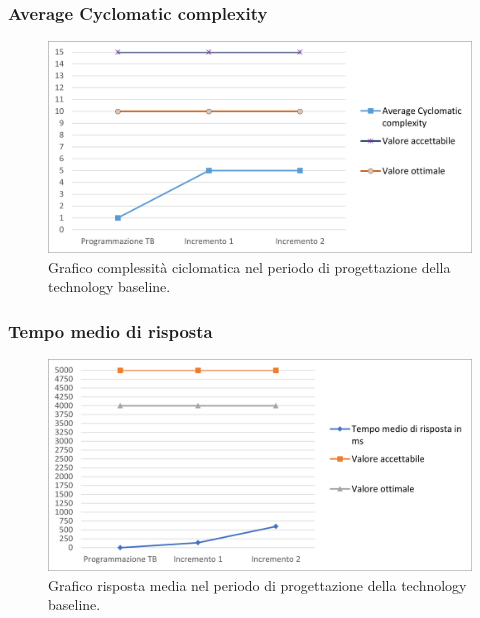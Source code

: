 \subsubsection{Average Cyclomatic complexity}
\begin{figure}[h]
	\centering
	\includegraphics[width=14cm]{Images/CyclomaticComplexity.png}
	\caption{Graﬁco complessità ciclomatica nel periodo di progettazione della technology baseline.}
\end{figure}


\subsubsection{Tempo medio di risposta}
\begin{figure}[h]
	\centering
	\includegraphics[width=14cm]{Images/TempoMedioRisposta.png}
	\caption{Graﬁco risposta media nel periodo di progettazione della technology baseline.}
\end{figure}

\newpage
